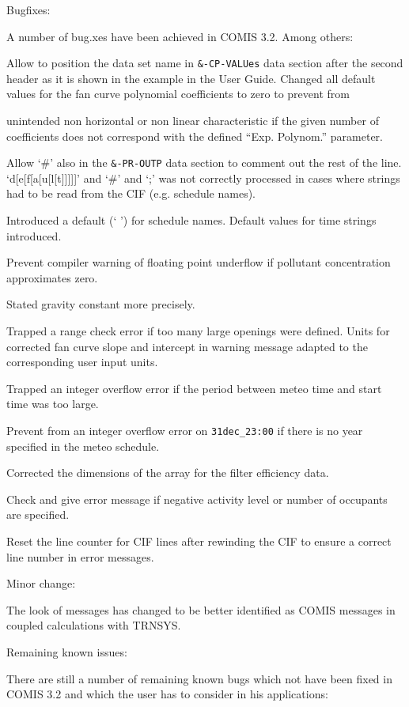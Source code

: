 \documentclass[10pt]{article}
\begin{document}
Bugfixes:

A number of bug.xes have been achieved in COMIS 3.2. Among others:

Allow to position the data set name in \verb|&-CP-VALUes| data section after the second header as it is shown in the example in the User Guide. Changed all default values for the fan curve polynomial coefficients to zero to prevent from

unintended non horizontal or non linear characteristic if the given number of coefficients does not correspond with the defined ``Exp. Polynom.'' parameter.

Allow `\#' also in the \verb|&-PR-OUTP| data section to comment out the rest of the line. `d[e[f[a[u[l[t]]]]]' and `\#' and `;' was not correctly processed in cases where strings had to be read from the CIF (e.g. schedule names).

Introduced a default (` ') for schedule names. 
Default values for time strings introduced. 


Prevent compiler warning of floating point underflow if pollutant concentration approximates zero.
 
Stated gravity constant more precisely. 


Trapped a range check error if too many large openings were defined. 
Units for corrected fan curve slope and intercept in warning message adapted to the corresponding user input units. 


Trapped an integer overflow error if the period between meteo time and start time was too large.
 
Prevent from an integer overflow error on \verb|31dec_23:00| if there is no year specified in the meteo schedule. 

Corrected the dimensions of the array for the filter efficiency data. 

Check and give error message if negative activity level or number of occupants are specified. 

Reset the line counter for CIF lines after rewinding the CIF to ensure a correct line number in error messages. 


Minor change:

The look of messages has changed to be better identified as COMIS messages in coupled calculations with TRNSYS. 

Remaining known issues:

There are still a number of remaining known bugs which not have been fixed in COMIS 3.2 and which the user has to consider in his applications:
\end{document}
